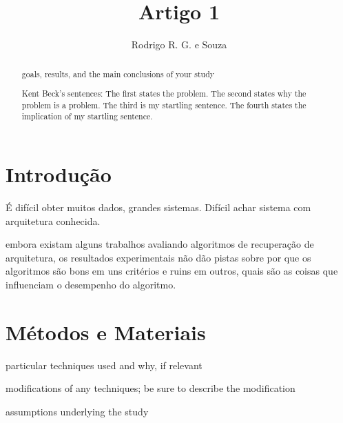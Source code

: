 \documentclass{article}
\begin{document}
\title{Artigo 1}
\author{Rodrigo R. G. e Souza}
\maketitle


\begin{abstract}

goals, results, and the main conclusions of your study

Kent Beck's sentences: The first states the problem. The second states why the problem is a problem. The third is my startling sentence. The fourth states the implication of my startling sentence.

\end{abstract}

\section{Introdução} %

% 
% 

É difícil obter muitos dados, grandes sistemas. Difícil achar sistema com arquitetura conhecida.

embora existam alguns trabalhos avaliando algoritmos de recuperação de arquitetura, os resultados experimentais não dão pistas sobre por que os algoritmos são bons em uns critérios e ruins em outros, quais são as coisas que influenciam o desempenho do algoritmo.


\section{Métodos e Materiais} %

particular techniques used and why, if relevant

modifications of any techniques; be sure to describe the modification

assumptions underlying the study 
\end{document}
